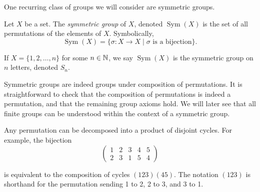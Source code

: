 
One recurring class of groups we will consider are symmetric groups.

\begin{definition} 
    Let $X$ be a set. The \emph{symmetric group} of $X$, denoted $\operatorname{Sym}(X)$ is the set of all permutations of the elements of $X$. Symbolically, $$\operatorname{Sym}(X) = \{\sigma: X \to X \mid \sigma \text{ is a bijection}\}.$$ 

    If $X = \{1, 2, \ldots, n\}$ for some $n \in \mathbb N$, we say $\operatorname{Sym}(X)$ is the symmetric group on $n$ letters, denoted $S_n$.
\end{definition}

\begin{remark}
    Symmetric groups are indeed groups under composition of permutations. It is straightforward to check that the composition of permutations is indeed a permutation, and that the remaining group axioms hold.
    We will later see that all finite groups can be understood within the context of a symmetric group.
\end{remark}

Any permutation can be decomposed into a product of disjoint cycles. For example, the bijection 
$$
\begin{pmatrix}
1 & 2 & 3 & 4 & 5\\
2 & 3 & 1 & 5 & 4
\end{pmatrix}
$$

is equivalent to the composition of cycles $(123)(45).$ The notation $(123)$ is shorthand for the permutation sending 1 to 2, 2 to 3, and 3 to 1.
